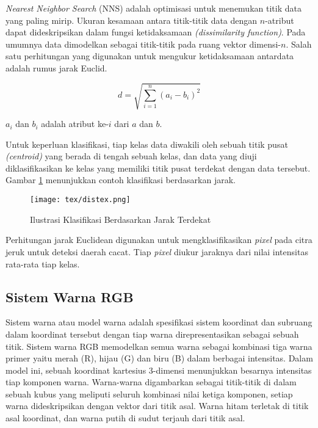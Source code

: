 \documentclass[laporan.tex]{subfiles}
\begin{document}
\emph{Nearest Neighbor Search} (NNS) adalah optimisasi untuk menemukan titik data yang paling mirip. Ukuran kesamaan antara titik-titik data dengan $n$-atribut dapat dideskripsikan dalam fungsi ketidaksamaan \emph{(dissimilarity function)}.\cite{knuth} Pada umumnya data dimodelkan sebagai titik-titik pada ruang vektor dimensi-$n$. Salah satu perhitungan yang digunakan untuk mengukur ketidaksamaan antardata adalah rumus jarak Euclid.

\begin{equation}
	d=\sqrt{\sum_{i=1}^n (a_i - b_i)^2}
\end{equation}

$a_i$ dan $b_i$ adalah atribut ke-$i$ dari $a$ dan $b$.

Untuk keperluan klasifikasi, tiap kelas data diwakili oleh sebuah titik pusat \emph{(centroid)} yang berada di tengah sebuah kelas, dan data yang diuji diklasifikasikan ke kelas yang memiliki titik pusat terdekat dengan data tersebut. Gambar \ref{fig:distex} menunjukkan contoh klasifikasi berdasarkan jarak.

\begin{figure}[h]
\centering
\texttt{[image: tex/distex.png]}
\caption{Ilustrasi Klasifikasi Berdasarkan Jarak Terdekat}
\label{fig:distex}
\end{figure}

Perhitungan jarak Euclidean digunakan untuk mengklasifikasikan \emph{pixel} pada citra jeruk untuk deteksi daerah cacat. Tiap \emph{pixel} diukur jaraknya dari nilai intensitas rata-rata tiap kelas.

\FloatBarrier

\subsection{Sistem Warna RGB}
Sistem warna atau model warna adalah spesifikasi sistem koordinat dan subruang dalam koordinat tersebut dengan tiap warna direpresentasikan sebagai sebuah titik. Sistem warna RGB memodelkan semua warna sebagai kombinasi tiga warna primer yaitu merah (R), hijau (G) dan biru (B) dalam berbagai intensitas. Dalam model ini, sebuah koordinat kartesius 3-dimensi menunjukkan besarnya intensitas tiap komponen warna. Warna-warna digambarkan sebagai titik-titik di dalam sebuah kubus yang meliputi seluruh kombinasi nilai ketiga komponen, setiap warna dideskripsikan dengan vektor dari titik asal. Warna hitam terletak di titik asal koordinat, dan warna putih di sudut terjauh dari titik asal.\cite{gon}
\end{document}
